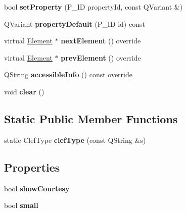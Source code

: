 \begin{DoxyCompactItemize}
bool {\bfseries set\+Property} (P\+\_\+\+ID property\+Id, const Q\+Variant \&)
\item 
\mbox{\label{class_ms_1_1_clef_aa79722c282d22b31b7fb3bdd31a23812}} 
Q\+Variant {\bfseries property\+Default} (P\+\_\+\+ID id) const
\item 
\mbox{\label{class_ms_1_1_clef_adaa40e903fdc69ef1769820e94e29c01}} 
virtual \hyperlink{class_ms_1_1_element}{Element} $\ast$ {\bfseries next\+Element} () override
\item 
\mbox{\label{class_ms_1_1_clef_a93ebd72c634bfa37a17c61fca7a4728f}} 
virtual \hyperlink{class_ms_1_1_element}{Element} $\ast$ {\bfseries prev\+Element} () override
\item 
\mbox{\label{class_ms_1_1_clef_a5077083492f0931089e04f45f23c875b}} 
Q\+String {\bfseries accessible\+Info} () const override
\item 
\mbox{\label{class_ms_1_1_clef_ab2ad3c3aaf19dd2c498ddbb12b20ad1e}} 
void {\bfseries clear} ()
\end{DoxyCompactItemize}
\subsection*{Static Public Member Functions}
\begin{DoxyCompactItemize}
\item 
\mbox{\label{class_ms_1_1_clef_ab6bf0a0ccc8357db3cc87d213d204811}} 
static Clef\+Type {\bfseries clef\+Type} (const Q\+String \&s)
\end{DoxyCompactItemize}
\subsection*{Properties}
\begin{DoxyCompactItemize}
\item 
\mbox{\label{class_ms_1_1_clef_ab698849d4e2e6dffba99b5a44fcd1f2a}} 
bool {\bfseries show\+Courtesy}
\item 
\mbox{\label{class_ms_1_1_clef_ae521f2498c0ff1d8c0f2617deab4b4df}} 
bool {\bfseries small}
\end{DoxyCompactItemize}
